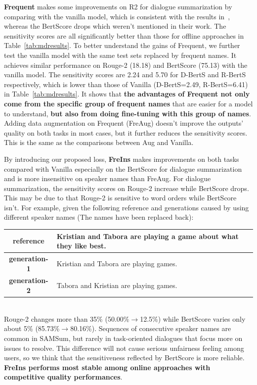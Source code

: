 \textbf{Frequent} makes some improvements on R2 for dialogue summarization by comparing with the vanilla model, which is consistent with the results in~\cite{khalifa2021bag}, whereas the BertScore drops which weren't mentioned in their work. The sensitivity scores are all significantly better than those for offline approaches in Table~\ref{tab:mdresults}. To better understand the gains of Frequent, we further test the vanilla model with the same test sets replaced by frequent names. It achieves similar performance on Rouge-2 (18.18) and BertScore (75.13) with the vanilla model. The sensitivity scores are 2.24 and 5.70 for D-BertS and R-BertS respectively, which is lower than those of Vanilla (D-BertS=2.49, R-BertS=6.41) in Table~\ref{tab:mdresults}. It shows that\textbf{ the advantages of Frequent not only come from the specific group of frequent names} that are easier for a model to understand, \textbf{but also from doing fine-tuning with this group of names}. Adding data augmentation on Frequent (FreAug) doesn't improve the outputs' quality on both tasks in most cases, but it further reduces the sensitivity scores. This is the same as the comparisons between Aug and Vanilla. 

By introducing our proposed loss, \textbf{FreIns} makes improvements on both tasks compared with Vanilla especially on the BertScore for dialogue summarization and is more insensitive on speaker names than FreAug. 
For dialogue summarization, the sensitivity scores on Rouge-2 increase while BertScore drops. This may be due to that Rouge-2 is sensitive to word orders while BertScore isn't. For example, given the following reference and generations caused by using different speaker names (The names have been replaced back):
\\
\begin{tabular}{|c|p{5.6cm}|}
	\hline
	\textbf{reference} & Kristian and Tabora are playing a game about what they like best.\\
	\hline
	\textbf{generation-1} & Kristian and Tabora are playing games.\\
	\hline
	\textbf{generation-2}& Tabora and Kristian are playing games. \\
	\hline
\end{tabular}
\\
Rouge-2 changes more than 35\% (50.00\%$\rightarrow$12.5\%) while BertScore varies only about 5\% (85.73\%$\rightarrow$80.16\%). Sequences of consecutive speaker names are common in SAMSum, but rarely in task-oriented dialogues that focus more on issues to resolve.
This difference will not cause serious unfairness feeling among users, so we think that the sensitiveness reflected by BertScore is more reliable.
\textbf{FreIns performs most stable among online approaches with competitive quality performances}. %

